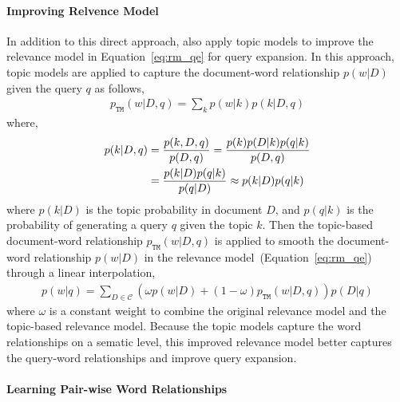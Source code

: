 \paragraph{Improving Relvence Model}

In addition to this direct approach, \cite{Yi-2009} also apply topic
models to improve the relevance model in Equation~\ref{eq:rm_qe} for
query expansion. In this approach, topic models are applied to capture
the document-word relationship $p(w|D)$ given the query $q$ as
follows,
\begin{align}
p_{\texttt{TM}}(w|D,q) = \sum_k p(w|k) p(k|D,q)
\end{align}
where,
\begin{align}
p(k|D,q) &= \frac{p(k,D,q)}{p(D,q)}  = \frac{p(k)p(D|k)p(q|k)}{p(D,q)} \\
&= \frac{p(k|D)p(q|k)}{p(q|D)} \approx p(k|D)p(q|k) \notag
\end{align}
where $p(k|D)$ is the topic probability in document $D$, and $p(q|k)$
is the probability of generating a query $q$ given the topic $k$. Then
the topic-based document-word relationship $p_{\texttt{TM}}(w|D,q)$ is
applied to smooth the document-word relationship $p(w|D)$ in the
relevance model~(Equation~\ref{eq:rm_qe}) through a linear
interpolation,
\begin{align}
p(w|q) = \sum_{D \in \mathcal{C}} (\omega p(w|D) + (1 - \omega)p_{\texttt{TM}}(w|D,q))p(D|q)
\end{align}
where $\omega$ is a constant weight to combine the original relevance
model and the topic-based relevance model. Because the topic models
capture the word relationships on a sematic level, this improved
relevance model better captures the query-word relationships and
improve query expansion.

\paragraph{Learning Pair-wise Word Relationships}

